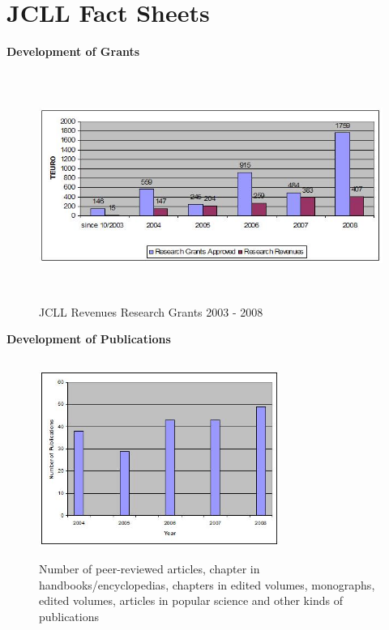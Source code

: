 \section{JCLL Fact Sheets} 

\textbf{Development of Grants}

\begin{figure}[htbp]
	\begin{center}
		\includegraphics[width=1\textwidth,height=7.5cm]{photo3.jpg}
		\caption{ JCLL Revenues Research Grants 2003 - 2008 }
	\end{center}
\end{figure}
$$ $$
\textbf{Development of Publications}

\begin{figure}[htbp]
	\begin{center}
		\includegraphics[width=0.7\textwidth,height=6.5cm]{photo4.jpg}
		\caption{Number of peer-reviewed articles, chapter in handbooks/encyclopedias, chapters in edited volumes, monographs, edited volumes, articles in popular science and other kinds of publications}
	\end{center}
\end{figure}

